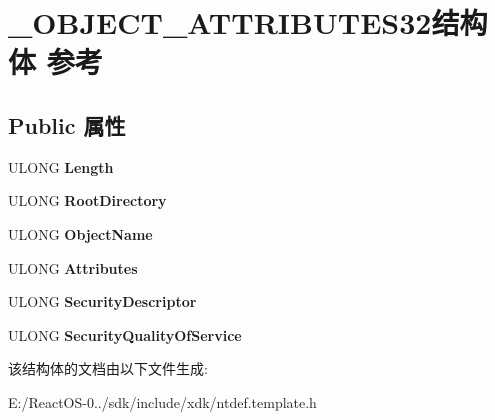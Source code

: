 \hypertarget{struct___o_b_j_e_c_t___a_t_t_r_i_b_u_t_e_s32}{}\section{\+\_\+\+O\+B\+J\+E\+C\+T\+\_\+\+A\+T\+T\+R\+I\+B\+U\+T\+E\+S32结构体 参考}
\label{struct___o_b_j_e_c_t___a_t_t_r_i_b_u_t_e_s32}
\subsection*{Public 属性}
\begin{DoxyCompactItemize}
\item 
\mbox{\label{struct___o_b_j_e_c_t___a_t_t_r_i_b_u_t_e_s32_a38162cf809a0b268e21c9dec1aa4a7a5}} 
U\+L\+O\+NG {\bfseries Length}
\item 
\mbox{\label{struct___o_b_j_e_c_t___a_t_t_r_i_b_u_t_e_s32_ad0f52142ca33d4638a98fc96a93b6711}} 
U\+L\+O\+NG {\bfseries Root\+Directory}
\item 
\mbox{\label{struct___o_b_j_e_c_t___a_t_t_r_i_b_u_t_e_s32_aaf0dee20a809fc2f7c660f2283ec7c0f}} 
U\+L\+O\+NG {\bfseries Object\+Name}
\item 
\mbox{\label{struct___o_b_j_e_c_t___a_t_t_r_i_b_u_t_e_s32_a85e68233217957680a331f860d36f99e}} 
U\+L\+O\+NG {\bfseries Attributes}
\item 
\mbox{\label{struct___o_b_j_e_c_t___a_t_t_r_i_b_u_t_e_s32_a812ec6864b0a5139f77e26b2cd071859}} 
U\+L\+O\+NG {\bfseries Security\+Descriptor}
\item 
\mbox{\label{struct___o_b_j_e_c_t___a_t_t_r_i_b_u_t_e_s32_a727f5b6c5af1a8cf68a607794356622d}} 
U\+L\+O\+NG {\bfseries Security\+Quality\+Of\+Service}
\end{DoxyCompactItemize}


该结构体的文档由以下文件生成\+:\begin{DoxyCompactItemize}
\item 
E\+:/\+React\+O\+S-\/0../sdk/include/xdk/ntdef.\+template.\+h\end{DoxyCompactItemize}

